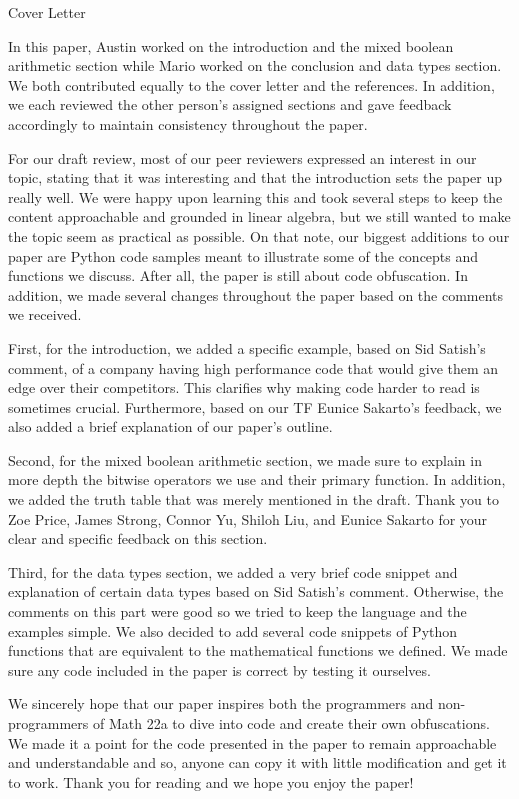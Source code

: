 \begin{center}
    {\huge Cover Letter}
\end{center}
\hspace{\parindent} In this paper, Austin worked on the introduction and the
mixed boolean arithmetic section while Mario worked on the conclusion and data
types section. We both contributed equally to the cover letter and the
references. In addition, we each reviewed the other person's assigned sections
and gave feedback accordingly to maintain consistency throughout the paper.


For our draft review, most of our peer reviewers expressed
an
interest in our
topic, stating that it was interesting and that the introduction sets the paper
up really well. We were happy upon learning this and took several steps to keep
the content approachable and grounded in linear algebra, but we still wanted to
make the topic seem as practical as possible. On that note, our biggest
additions to our paper are Python code samples meant to illustrate some of the
concepts and functions we discuss. After all, the paper is still about code
obfuscation. In addition, we made several changes throughout the paper based on
the comments we received.

First, for the introduction, we added a specific example, based on Sid Satish's
comment, of a company having high performance code that would give them an edge
over their competitors. This clarifies why making code harder to read is
sometimes crucial. Furthermore, based on our TF Eunice Sakarto's feedback, we
also added a brief explanation of our paper's outline.

Second, for the mixed boolean arithmetic section, we made sure to explain in
more depth the bitwise operators we use and their primary function. In
addition, we added the truth table that was merely mentioned in the draft.
Thank you to Zoe Price, James Strong, Connor Yu, Shiloh Liu, and Eunice Sakarto
for your clear and specific feedback on this section.

Third, for the data types section, we added a very brief code snippet and
explanation of certain data types based on Sid Satish's comment. Otherwise,
the comments on this part were good so we tried to keep the language and the
examples simple. We also decided to add several code snippets of Python
functions that are equivalent to the mathematical functions we defined. We made
sure any code included in the paper is correct by testing it ourselves.

We sincerely hope that our paper inspires both the programmers and
non-programmers of Math 22a to dive into code and create their own
obfuscations. We made it a point for the code presented in the paper to remain
approachable and understandable and so, anyone can copy it with little
modification and get it to work. Thank you for reading and we hope you
enjoy the paper!
\newpage